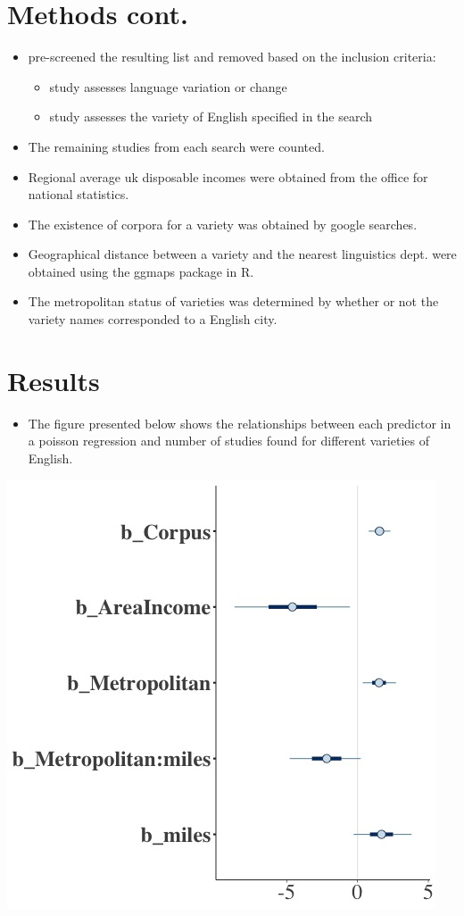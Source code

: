\documentclass[a0paper,fleqn]{betterposter}
\begin{document}
{
	\section{Methods cont.}	
\begin{itemize}
	\item pre-screened the resulting list and removed based on the inclusion criteria:
	\begin{itemize}
		\item study assesses language variation or change
		\item study assesses the variety of English specified in the search
	\end{itemize}
	\item The remaining studies from each search were counted.

	\item Regional average uk disposable incomes were obtained from the office for national statistics.
	\item The existence of corpora for a variety was obtained by google searches.
	\item Geographical distance between a variety and the nearest linguistics dept. were obtained using the ggmaps package in R.
	
	\item The metropolitan status of varieties was determined by whether or not the variety names corresponded to a English city.
\end{itemize}



\section{Results}


	\begin{itemize}
	\item The figure presented below shows the relationships between each predictor in a poisson regression and number of studies found for different varieties of English. 
	\end{itemize}
	\includegraphics[scale=1.1]{new.jpg}
	

}
\end{document}

